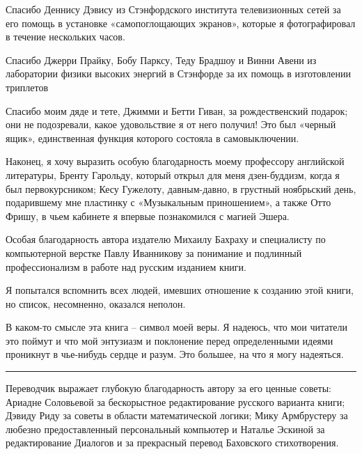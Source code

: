 \documentclass[../main.tex]{subfiles}
\begin{document}
Спасибо Деннису Дэвису из Стэнфордского института телевизионных сетей за его помощь в установке «самопоглощающих экранов», которые я фотографировал в течение нескольких часов.

Спасибо Джерри Прайку, Бобу Парксу, Теду Брадшоу и Винни Авени из лаборатории физики высоких энергий в Стэнфорде за их помощь в изготовлении триплетов

Спасибо моим дяде и тете, Джимми и Бетти Гиван, за рождественский подарок; они не подозревали, какое удовольствие я от него получил!
Это был «черный ящик», единственная функция которого состояла в самовыключении.

Наконец, я хочу выразить особую благодарность моему профессору английской литературы, Бренту Гарольду, который открыл для меня дзен-буддизм, когда я был первокурсником; Кесу Гужелоту, давным-давно, в грустный ноябрьский день, подарившему мне пластинку с «Музыкальным приношением», а также Отто Фришу, в чьем кабинете я впервые познакомился с магией Эшера.

Особая благодарность автора издателю Михаилу Бахраху и специалисту по компьютерной верстке Павлу Иванникову за понимание и подлинный профессионализм в работе над русским изданием книги.

Я попытался вспомнить всех людей, имевших отношение к созданию этой книги, но список, несомненно, оказался неполон.

В каком-то смысле эта книга \--- символ моей веры. Я надеюсь, что мои читатели это поймут и что мой энтузиазм и поклонение перед определенными идеями проникнут в чье-нибудь сердце и разум. Это большее, на что я могу надеяться.

\fancybreak{$\ast$ $\ast$ $\ast$}

Переводчик выражает глубокую благодарность автору за его ценные советы: Ариадне Соловьевой за бескорыстное редактирование русского варианта книги; Дэвиду Риду за советы в области математической логики; Мику Армбрустеру за любезно предоставленный персональный компьютер и Наталье Эскиной за редактирование Диалогов и за прекрасный перевод Баховского стихотворения.
\end{document}
